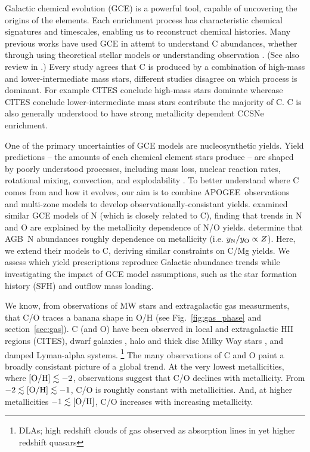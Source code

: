 \documentclass[fleqn,usenatbib]{mnras}
\newcommand{\agb}{AGB}
\newcommand{\apogee}{APOGEE}
\newcommand{\gce}{GCE}
\newcommand{\sfh}{SFH} %
\newcommand{\lims}{lower-intermediate mass stars}
\newcommand{\hms}{high-mass stars}
\begin{document}


Galactic chemical evolution (\gce) is a powerful tool, capable of uncovering the origins of the elements. 
Each enrichment process has characteristic chemical signatures and timescales, enabling us to reconstruct chemical histories.
Many previous works have used GCE in attemt to understand C abundances, whether through using theoretical stellar models \citep{DTS78, prantzos+18, chiappini+03} 
or understanding  observation \citep{tinsley79, HEK00, BF06, rybizki+17, berg+19, KKL20}.
(See also review in \citealt{romano22}.)
%
Every study agrees that C is produced by a combination of high-mass and \lims{}, different studies disagree on which process is dominant. 
For example CITES conclude \hms{} dominate wherease CITES conclude \lims{} contribute the majority of C.
C is also generally understood to have strong metallicity dependent CCSNe enrichment. 


One of the primary uncertainties of GCE models are nucleosynthetic yields. Yield predictions -- the amounts of each chemical element stars produce --
are shaped by poorly understood processes, including mass loss, nuclear reaction rates, rotational mixing, convection, and explodability \citep{romano+10,KL14,ventura+13, LC18, emily+21}.
To better understand where C comes from and how it evolves, our aim is to combine \apogee\ observations and multi-zone models to develop observationally-consistant yields.
\cite{james+23} examined similar \gce{} models of N (which is closely related to C), finding that trends in N and O are explained by the metallicity dependence of N/O yields. \citet{james+23} determine that \agb\ N abundances roughly dependence on metallicity (i.e. $y_{\rm N}/y_{\rm O} \propto Z$). 
Here, we extend their models to C, deriving similar constraints on C/Mg yields. We assess which yield prescriptions reproduce Galactic abundance trends while investigating the impact of \gce{} model assumptions, such as the star formation history (\sfh{}) and outflow mass loading.

 
We know, from observations of MW stars and extragalactic gas measurments, that C/O traces a banana shape in O/H (see Fig.~\ref{fig:gas_phase} and section~\ref{sec:gas}). 
C (and O) have been observed in local and extragalactic HII regions (CITES), dwarf galaxies \citep[e.g.]{berg+19}, halo and thick disc Milky Way stars \cite[e.g.][]{fabbian+09, nissen+14, lambert81, laird85, lambert86}, and damped Lyman-alpha systems. 
\footnote{DLAs; high redshift clouds of gas observed as absorption lines in yet higher redshift quasars}
The many observations of C and O paint a broadly consistant picture of a global trend.
At the very lowest metallicities, where $[{\rm O/H}]\lesssim-2$,\footnotemark{} observations suggest that C/O declines with metallicity.
From $-2 \lesssim {\rm [O/H]}\lesssim -1$, C/O is roughtly constant with metallicities. 
And, at higher metallicities $-1 \lesssim {\rm [O/H]}$, C/O increases with increasing metallicity.
\end{document}
